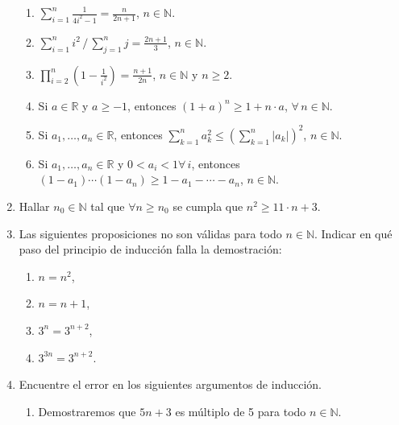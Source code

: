 \documentclass[12pt,spanish,makeidx]{amsbook}
\begin{document}
\begin{enumerate}
\begin{enumerate}
  \item $\displaystyle{ \sum_{i=1}^n \frac{1}{4i^2-1} = \frac{n}{2n+1}}$, $n\in \mathbb N$.

  \item $\displaystyle{ \sum_{i=1}^n i^2\, /\, \sum_{j=1}^n j = \frac{2n+1}{3}}$, $n\in \mathbb N$.

  \item $\displaystyle{ \prod_{i=2}^n \left(1-\frac{1}{i^2}\right) = \frac{n+1}{2n}}$, $n\in \mathbb N$ y $ n\ge 2$.

  \item Si $a\in \mathbb R$ y $a\geq -1$, entonces $(1+a)^n\geq 1+n\cdot a$, $\forall \, n \in \mathbb N$.

  \item Si $a_1,\dots,a_n \in \mathbb R$, entonces $\displaystyle{\sum_{k=1}^n a_{k}^{2}\leq \left(\sum_{k=1}^n |a_{k}|\right)^{2}}$, $n\in \mathbb N$.


  \item Si $a_1,\dots,a_n \in \mathbb R$ y $0<a_i<1 \forall \, i$, entonces $(1-a_1)\cdots(1-a_n)\ge 1-a_1-\cdots -a_n$, $n\in \mathbb N$.

  \end{enumerate}

\smallskip




\item Hallar $n_0 \in {\mathbb N}$ tal que $\forall n \ge n_0$ se cumpla que $n^2 \ge 11 \cdot n + 3$.

\smallskip


\item Las siguientes proposiciones no son v\'alidas para todo $n \in {\mathbb N}$. Indicar en qu\'e paso del principio de inducci\'on falla la demostraci\'on:
\begin{multicols}{4}
\begin{enumerate}
\item  $n=n^2$,
\item  $n=n+1$,
\item  $3^n = 3^{n+2}$,
\item  $3^{3n} = 3^{n+2}$.
\end{enumerate}
\end{multicols}

\smallskip

\item Encuentre el error en los siguientes argumentos de inducci\'on.
\begin{enumerate}
\item  Demostraremos que $5n+3$ es m\'ultiplo de 5 para todo $n\in \mathbb N$.


\end{enumerate}
\end{enumerate}
\end{document}
